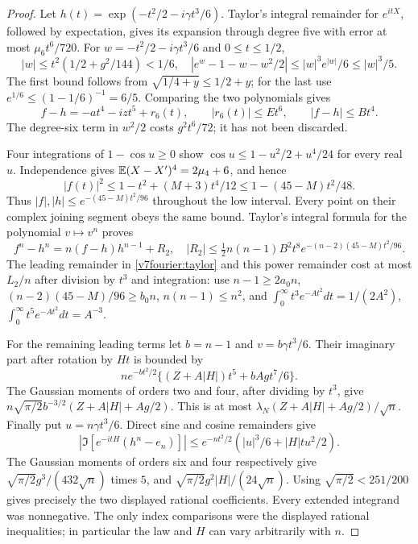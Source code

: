 \begin{proof}
Let $h(t)=\exp(-t^2/2-i\gamma t^3/6)$. Taylor's integral remainder
for $e^{itX}$, followed by expectation, gives its expansion through
degree five with error at most $\mu_6t^6/720$. For
$w=-t^2/2-i\gamma t^3/6$ and $0\le t\le1/2$,
\[
 |w|\le t^2(1/2+g^2/144)<1/6,
 \quad |e^w-1-w-w^2/2|\le |w|^3e^{|w|}/6\le |w|^3/5.
\]
The first bound follows from $\sqrt{1/4+y}\le1/2+y$; for the last
use $e^{1/6}\le(1-1/6)^{-1}=6/5$. Comparing the two polynomials gives
\begin{equation}\label{v7fourier:taylor}
 f-h=-at^4-izt^5+r_6(t),\qquad |r_6(t)|\le Et^6,
 \qquad |f-h|\le Bt^4.
\end{equation}
The degree-six term in $w^2/2$ costs $g^2t^6/72$; it has not been
discarded.

Four integrations of $1-\cos u\ge0$ show
$\cos u\le1-u^2/2+u^4/24$ for every real $u$. Independence gives
$\mathbb E(X-X')^4=2\mu_4+6$, and hence
\[
 |f(t)|^2\le1-t^2+(M+3)t^4/12
 \le1-(45-M)t^2/48.
\]
Thus $|f|,|h|\le e^{-(45-M)t^2/96}$ throughout the low interval.
Every point on their complex joining segment obeys the same bound.
Taylor's integral formula for the polynomial $v\mapsto v^n$ proves
\[
 f^n-h^n=n(f-h)h^{n-1}+R_2,\quad
 |R_2|\le\tfrac12n(n-1)B^2t^8e^{-(n-2)(45-M)t^2/96}.
\]
The leading remainder in \eqref{v7fourier:taylor} and this power
remainder cost at most $L_2/n$ after division by $t^3$ and integration:
use $n-1\ge2a_0n$, $(n-2)(45-M)/96\ge b_0n$, $n(n-1)\le n^2$,
and $\int_0^\infty t^3e^{-At^2}dt=1/(2A^2)$,
$\int_0^\infty t^5e^{-At^2}dt=A^{-3}$.

For the remaining leading terms let $b=n-1$ and
$v=b\gamma t^3/6$. Their imaginary part after rotation by $Ht$ is
bounded by
\[
 ne^{-bt^2/2}\{(Z+A|H|)t^5+bAg t^7/6\}.
\]
The Gaussian moments of orders two and four, after dividing by $t^3$,
give $n\sqrt{\pi/2}b^{-3/2}(Z+A|H|+Ag/2)$.
This is at most $\lambda_N(Z+A|H|+Ag/2)/\sqrt n$.
Finally put $u=n\gamma t^3/6$. Direct sine and cosine remainders give
\[
 |\Im[e^{-itH}(h^n-e_n)]|
 \le e^{-nt^2/2}(|u|^3/6+|H|t u^2/2).
\]
The Gaussian moments of orders six and four respectively give
$\sqrt{\pi/2}g^3/(432\sqrt n)$ times $5$, and
$\sqrt{\pi/2}g^2|H|/(24\sqrt n)$.
Using $\sqrt{\pi/2}<251/200$ gives precisely the two displayed
rational coefficients. Every extended integrand was nonnegative.
The only index comparisons were the displayed rational inequalities;
in particular the law and $H$ can vary arbitrarily with $n$.
\end{proof}

